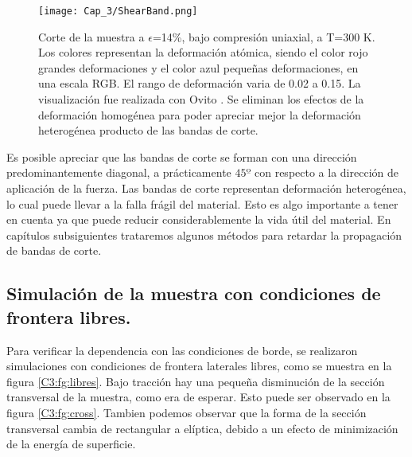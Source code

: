 \begin{figure}[htp]
\centering
\texttt{[image: Cap\_3/ShearBand.png]}
\caption[Corte de la muestra a $\epsilon$=14\%, bajo compresión uniaxial, a T=300 K.]{Corte de la muestra a $\epsilon$=14\%, bajo compresión uniaxial, a T=300 K. Los colores representan la deformación atómica, siendo el color rojo grandes deformaciones y el color azul pequeñas deformaciones, en una escala RGB. El rango de deformación varia de 0.02 a 0.15. La visualización fue realizada con Ovito \citep{stukowski10}. Se eliminan los efectos de la deformación homogénea para poder apreciar mejor la deformación heterogénea producto de las bandas de corte.}
\label{C3:fg:SBs}
\end{figure}

Es posible apreciar que las bandas de corte se forman con una dirección predominantemente diagonal, a prácticamente $45º$ con respecto a la dirección de aplicación de la fuerza. Las bandas de corte representan deformación heterogénea, lo cual puede llevar a la falla frágil del material. Esto es algo importante a tener en cuenta ya que puede reducir considerablemente la vida útil del material. En capítulos subsiguientes trataremos algunos métodos para retardar la propagación de bandas de corte.

\subsection{Simulación de la muestra con condiciones de frontera libres.}
\label{S3_3_2}

Para verificar la dependencia con las condiciones de borde, se realizaron simulaciones con condiciones de frontera laterales libres, como se muestra en la figura \ref{C3:fg:libres}. Bajo tracción hay una pequeña disminución de la sección transversal de la muestra, como era de esperar. Esto puede ser observado en la figura \ref{C3:fg:cross}. Tambien podemos observar que la forma de la sección transversal cambia de rectangular a elíptica, debido a un efecto de minimización de la energía de superficie.


